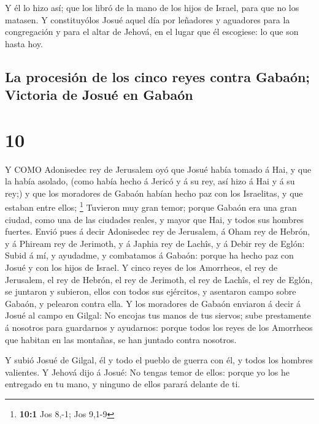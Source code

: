  Y él lo hizo así; que los libró de la mano de los hijos de
Israel, para que no los matasen.  Y constituyólos Josué
aquel día por leñadores y aguadores para la congregación y para el altar
de Jehová, en el lugar que él escogiese: lo que son hasta hoy.

\hypertarget{la-procesiuxf3n-de-los-cinco-reyes-contra-gabauxf3n-victoria-de-josuuxe9-en-gabauxf3n}{%
\subsection{La procesión de los cinco reyes contra Gabaón; Victoria de
Josué en
Gabaón}\label{la-procesiuxf3n-de-los-cinco-reyes-contra-gabauxf3n-victoria-de-josuuxe9-en-gabauxf3n}}

\hypertarget{section-9}{%
\section{10}\label{section-9}}

 Y COMO Adonisedec rey de Jerusalem oyó que Josué había
tomado á Hai, y que la había asolado, (como había hecho á Jericó y á su
rey, así hizo á Hai y á su rey;) y que los moradores de Gabaón habían
hecho paz con los Israelitas, y que estaban entre ellos; \footnote{\textbf{10:1}
  Jos 8,-1; Jos 9,1-9}  Tuvieron muy gran temor; porque
Gabaón era una gran ciudad, como una de las ciudades reales, y mayor que
Hai, y todos sus hombres fuertes.  Envió pues á decir
Adonisedec rey de Jerusalem, á Oham rey de Hebrón, y á Phiream rey de
Jerimoth, y á Japhia rey de Lachîs, y á Debir rey de Eglón: 
Subid á mí, y ayudadme, y combatamos á Gabaón: porque ha hecho paz con
Josué y con los hijos de Israel.  Y cinco reyes de los
Amorrheos, el rey de Jerusalem, el rey de Hebrón, el rey de Jerimoth, el
rey de Lachîs, el rey de Eglón, se juntaron y subieron, ellos con todos
sus ejércitos, y asentaron campo sobre Gabaón, y pelearon contra ella.
 Y los moradores de Gabaón enviaron á decir á Josué al campo
en Gilgal: No encojas tus manos de tus siervos; sube prestamente á
nosotros para guardarnos y ayudarnos: porque todos los reyes de los
Amorrheos que habitan en las montañas, se han juntado contra nosotros.

 Y subió Josué de Gilgal, él y todo el pueblo de guerra con
él, y todos los hombres valientes.  Y Jehová dijo á Josué:
No tengas temor de ellos: porque yo los he entregado en tu mano, y
ninguno de ellos parará delante de ti.

